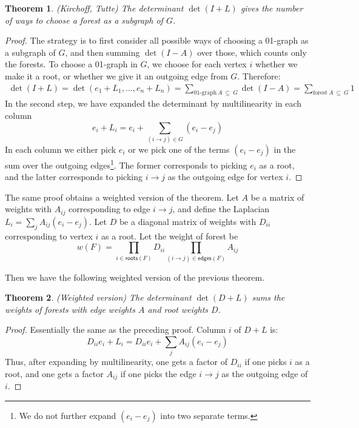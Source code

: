 \documentclass[a4paper, 11pt]{article}
\newtheorem{theorem}{Theorem}[section]
\theoremstyle{definition}
\begin{document}
\begin{theorem}
  (Kirchoff, Tutte) The determinant $\det(I + L)$ gives the number of ways to choose a forest as a subgraph of $G$.
\end{theorem}
\begin{proof}
  The strategy is to first consider all possible ways of choosing a 01-graph as a subgraph of $G$, and then summing $\det(I - A)$ over those, which counts only the forests. To choose a 01-graph in $G$, we choose for each vertex $i$ whether we make it a root, or whether we give it an outgoing edge from $G$. Therefore:
  \begin{align*}
    \det(I + L) = \det(e_1 + L_1, \dots, e_n + L_n)
     = \sum_{\text{01-graph}\ A\ \subseteq\ G} \det(I - A) = \sum_{\text{forest}\ A\ \subseteq\ G} 1
  \end{align*}
  In the second step, we have expanded the determinant by multilinearity in each column
  \[ e_i + L_i = e_i + \sum_{(i \to j) \in G} (e_i - e_j) \]
  In each column we either pick $e_i$ or we pick one of the terms $(e_i - e_j)$ in the sum over the outgoing edges\footnote{We do not further expand $(e_i - e_j)$ into two separate terms.}. The former corresponds to picking $e_i$ as a root, and the latter corresponds to picking $i \to j$ as the outgoing edge for vertex $i$.
\end{proof}

The same proof obtains a weighted version of the theorem. Let $A$ be a matrix of weights with $A_{ij}$ corresponding to edge $i \to j$, and define the Laplacian $L_i = \sum_j A_{ij}(e_i - e_j)$. Let $D$ be a diagonal matrix of weights with $D_{ii}$ corresponding to vertex $i$ as a root. Let the weight of forest be \[w(F) = \prod_{i \in \mathsf{roots}(F)} D_{ii} \prod_{(i \to j) \in \mathsf{edges}(F)} A_{ij} \]

Then we have the following weighted version of the previous theorem.

\begin{theorem} (Weighted version) The determinant $\det(D + L)$ sums the weights of forests with edge weights $A$ and root weights $D$.
\end{theorem}
\begin{proof}
  Essentially the same as the preceding proof. Column $i$ of $D+L$ is:
  \[ D_{ii} e_i + L_i = D_{ii} e_i + \sum_j A_{ij}(e_i - e_j) \]
  Thus, after expanding by multilinearity, one gets a factor of $D_{ii}$ if one picks $i$ as a root, and one gets a factor $A_{ij}$ if one picks the edge $i \to j$ as the outgoing edge of $i$.
\end{proof}
\end{document}
